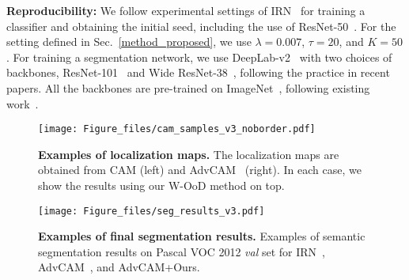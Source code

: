 \documentclass[10pt,twocolumn,letterpaper]{article}
\begin{document}
\textbf{Reproducibility:}
We follow experimental settings of IRN~\cite{ahn2019weakly} for training a classifier and obtaining the initial seed, including the use of ResNet-50~\cite{he2016deep}. 
For the setting defined in Sec.~\ref{method_proposed}, we use $\lambda=0.007$, $\tau=20$, and $K=50$. 
For training a segmentation network, we use DeepLab-v2~\cite{chen2017deeplab} with two choices of backbones, ResNet-101~\cite{he2016deep} and Wide ResNet-38~\cite{wu2019wider}, following the practice in recent papers.
All the backbones are pre-trained on ImageNet~\cite{deng2009imagenet}, following existing work~\cite{ahn2018learning, wang2020self, zhang2020causal, kweon2021unlocking, li2021pseudo}.





\begin{figure*}[t]
\centering
\texttt{[image: Figure\_files/cam\_samples\_v3\_noborder.pdf]}
\vspace{-1em}
\caption{\label{cam_samples} \textbf{Examples of localization maps.} The localization maps are obtained from CAM (left) and AdvCAM~\cite{lee2021anti} (right). In each case, we show the results using our W-OoD method on top.
}
\vspace{-0.5em}
\end{figure*}
 \begin{figure*}[t]
\centering
\texttt{[image: Figure\_files/seg\_results\_v3.pdf]}
\vspace{-1.2em}
\caption{\label{segsample} \textbf{Examples of final segmentation results.} Examples of semantic segmentation results on {Pascal VOC 2012} \textit{val} set for IRN~\cite{ahn2019weakly}, AdvCAM~\cite{lee2021anti}, and AdvCAM+Ours. 
}
\vspace{-1em}
\end{figure*}
 
\end{document}
